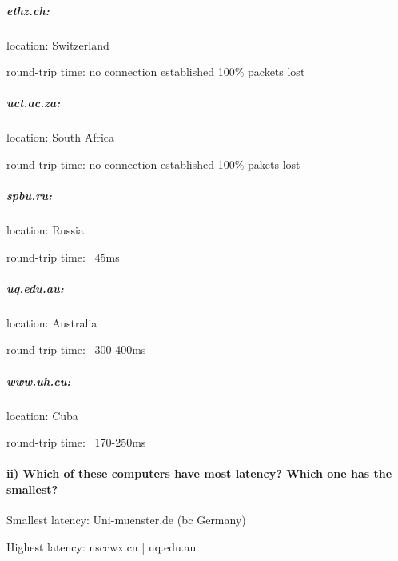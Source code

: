 \documentclass[a4paper,12pt]{article}
\begin{document}
    \subparagraph{ethz.ch:}
    \begin{description}[font=$\bullet$~\normalfont\scshape]
    \item location: Switzerland
    \item round-trip time: no connection established 100\% packets lost
    \end{description}

    \subparagraph{uct.ac.za:}
    \begin{description}[font=$\bullet$~\normalfont\scshape]
    \item location: South Africa
    \item round-trip time: no connection established 100\% pakets lost
    \end{description}

    \subparagraph{spbu.ru:}
    \begin{description}[font=$\bullet$~\normalfont\scshape]
    \item location: Russia
    \item round-trip time: ~45ms
    \end{description}

    \subparagraph{uq.edu.au:}
    \begin{description}[font=$\bullet$~\normalfont\scshape]
    \item location: Australia
    \item round-trip time: ~300-400ms
    \end{description}

    \subparagraph{www.uh.cu:}
    \begin{description}[font=$\bullet$~\normalfont\scshape]
    \item location: Cuba
    \item round-trip time: ~170-250ms
    \end{description}

    \paragraph{ii) Which of these computers have most latency? Which one has the smallest?}
    \begin{description}[font=$\bullet$~\normalfont\scshape]
    \item Smallest latency: Uni-muenster.de (bc Germany)
    \item Highest latency: nsccwx.cn | uq.edu.au
    \end{description}
\end{document}
